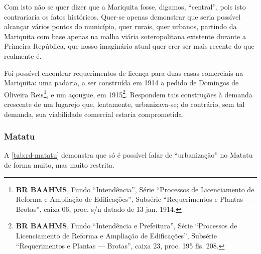 Com isto não se quer dizer que a Mariquita fosse, digamos, ``central'', pois isto contrariaria os fatos históricos. Quer-se apenas demonstrar que seria possível alcançar vários pontos do município, quer rurais, quer urbanos, partindo da Mariquita com base apenas na malha viária soteropolitana existente durante a Primeira República, que nosso imaginário atual quer crer ser mais recente do que realmente é.


Foi possível encontrar requerimentos de licença para duas casas comerciais na Mariquita: uma padaria, a ser construída em 1914 a pedido de Domingos de Oliveira Reis\footnote{\textbf{BR BAAHMS}, Fundo ``Intendência'', Série ``Processos de Licenciamento de Reforma e Ampliação de Edificações'', Subsérie ``Requerimentos e Plantas --- Brotas'', caixa 06, proc. s/n datado de 13 jan. 1914.}, e um açougue, em 1915\footnote{\textbf{BR BAAHMS}, Fundo ``Intendência e Prefeitura'', Série ``Processos de Licenciamento de Reforma e Ampliação de Edificações'', Subsérie ``Requerimentos e Plantas --- Brotas'', caixa 23, proc. 195 fls. 208.}. Respondem tais construções à demanda crescente de um lugarejo que, lentamente, urbanizava-se; do contrário, sem tal demanda, sua viabilidade comercial estaria comprometida.












\subsubsection{Matatu}


A \autoref{tab:rd-matatu} demonstra que só é possível falar de ``urbanização'' no Matatu de forma muito, mas muito restrita.








